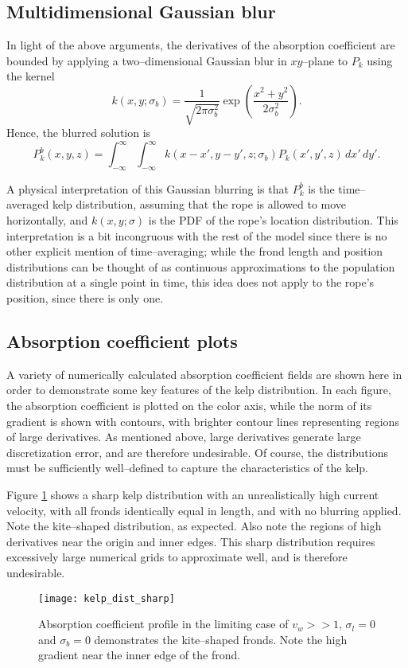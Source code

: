 \subsection{Multidimensional Gaussian blur}
In light of the above arguments, the derivatives of the absorption coefficient are bounded by applying a two--dimensional Gaussian blur in $xy$--plane to $P_k$ using the kernel
\begin{equation}
  k(x, y; \sigma_b) = \frac{1}{\sqrt{2\pi\sigma_b^2}} \exp\left(\frac{x^2 + y^2}{2\sigma_b^2}\right).
\end{equation}
Hence, the blurred solution is
\begin{equation}
  P_k^b(x, y, z) = \int_{-\infty}^\infty \int_{-\infty}^\infty k(x-x', y-y', z; \sigma_b) P_k(x', y', z)\, dx'\, dy'.
\end{equation}

A physical interpretation of this Gaussian blurring is that $P_k^b$ is the time--averaged kelp distribution, assuming that the rope is allowed to move horizontally, and $k(x, y; \sigma)$ is the PDF of the rope's location distribution.
This interpretation is a bit incongruous with the rest of the model since there is no other explicit mention of time--averaging; while the frond length and position distributions can be thought of as continuous approximations to the population distribution at a single point in time, this idea does not apply to the rope's position, since there is only one.

\subsection{Absorption coefficient plots}
A variety of numerically calculated absorption coefficient fields are shown here in order to demonstrate some key features of the kelp distribution.
In each figure, the absorption coefficient is plotted on the color axis, while the norm of its gradient is shown with contours, with brighter contour lines representing regions of large derivatives.
As mentioned above, large derivatives generate large discretization error, and are therefore undesirable.
Of course, the distributions must be sufficiently well--defined to capture the characteristics of the kelp.

Figure \ref{fig:kelp_dist_sharp} shows a sharp kelp distribution with an unrealistically high current velocity, with all fronds identically equal in length, and with no blurring applied.
Note the kite--shaped distribution, as expected.
Also note the regions of high derivatives near the origin and inner edges.
This sharp distribution requires excessively large numerical grids to approximate well, and is therefore undesirable.
\begin{figure}[H]
  \centering
  \texttt{[image: kelp\_dist\_sharp]}
  \caption{Absorption coefficient profile in the limiting case of $v_w>>1$, $\sigma_l=0$ and $\sigma_b=0$ demonstrates the kite--shaped fronds. Note the high gradient near the inner edge of the frond.}
  \label{fig:kelp_dist_sharp}
\end{figure}

